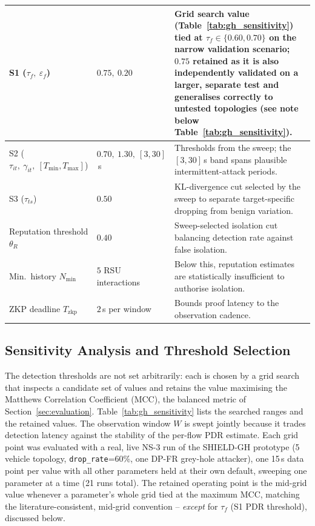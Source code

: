\documentclass[12pt, a4paper]{report}
\begin{document}
{\begin{longtable}{| p{3.0cm} | p{4.3cm} | p{6.0cm} |}
\hline
S1 ($\tau_f,\ \varepsilon_f$) & $0.75,\ 0.20$ & Grid search value (Table~\ref{tab:gh_sensitivity}) tied at $\tau_f\in\{0.60,0.70\}$ on the narrow validation scenario; $0.75$ retained as it is also independently validated on a larger, separate test and generalises correctly to untested topologies (see note below Table~\ref{tab:gh_sensitivity}). \\
\hline
S2 ($\tau_{it},\ \gamma_{it},\ [T_{\min},T_{\max}]$) & $0.70,\ 1.30,\ [3,30]$\,s & Thresholds from the sweep; the $[3,30]$\,s band spans plausible intermittent-attack periods. \\
\hline
S3 ($\tau_{ts}$) & $0.50$ & KL-divergence cut selected by the sweep to separate target-specific dropping from benign variation. \\
\hline
Reputation threshold $\theta_R$ & $0.40$ & Sweep-selected isolation cut balancing detection rate against false isolation. \\
\hline
Min.\ history $N_{\text{min}}$ & $5$ RSU interactions & Below this, reputation estimates are statistically insufficient to authorise isolation. \\
\hline
ZKP deadline $T_{\text{zkp}}$ & $2$\,s per window & Bounds proof latency to the observation cadence. \\
\hline
\end{longtable}
}

\subsection{Sensitivity Analysis and Threshold Selection}
\label{subsec:gh_sensitivity}

The detection thresholds are not set arbitrarily: each is chosen by a grid
search that inspects a candidate set of values and retains the value
maximising the Matthews Correlation Coefficient (MCC), the balanced metric
of Section~\ref{sec:evaluation}. Table~\ref{tab:gh_sensitivity} lists the
searched ranges and the retained values. The observation window $W$ is
swept jointly because it trades detection latency against the stability of
the per-flow PDR estimate. Each grid point was evaluated with a real,
live NS-3 run of the SHIELD-GH prototype (5\,vehicle topology,
\texttt{drop\_rate}=60\%, one DP-FR grey-hole attacker), one 15\,s data
point per value with all other parameters held at their own default,
sweeping one parameter at a time (21 runs total). The retained operating
point is the mid-grid value whenever a parameter's whole grid tied at the
maximum MCC, matching the literature-consistent, mid-grid convention --
\emph{except} for $\tau_f$ (S1 PDR threshold), discussed below.
\end{document}
